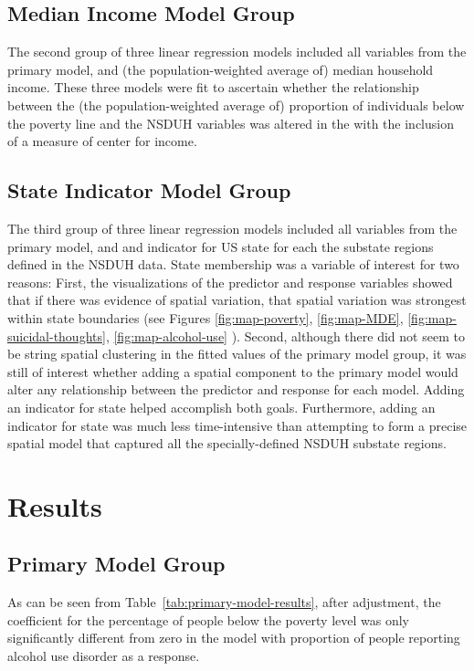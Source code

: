 \documentclass{article}
\begin{document}
\subsection{Median Income Model Group}

The second group of three linear regression models included all variables
from the primary model,
and
(the population-weighted average of)
median household income.
These three models were fit to ascertain whether
the relationship between the
(the population-weighted average of)
proportion of individuals below the poverty line
and the NSDUH variables was altered in the
with the inclusion of a measure of center for income.

\subsection{State Indicator Model Group}

The third group of three linear regression models included all variables
from the primary model,
and and indicator for US state for each the
substate regions defined in the NSDUH data.
State membership was a variable of interest for two
reasons:
First, the visualizations of the predictor and response variables
showed that if there was evidence of spatial variation,
that spatial variation was strongest within state boundaries
(see Figures
\ref{fig:map-poverty},
\ref{fig:map-MDE},
\ref{fig:map-suicidal-thoughts},
\ref{fig:map-alcohol-use}
).
Second, although there did not seem to be string spatial
clustering in the fitted values of the primary model group,
it was still of interest whether adding a spatial component to
the primary model would alter any relationship between
the predictor and response for each model.
Adding an indicator for state helped accomplish both goals.
Furthermore, adding an indicator for state was much less
time-intensive than attempting to form a precise spatial model
that captured all the specially-defined NSDUH substate regions.


\section{Results}

\subsection{Primary Model Group}

As can be seen from Table~\ref{tab:primary-model-results},
after adjustment,
the coefficient for the percentage of people below the poverty level
was only significantly different from zero
in the model with proportion of people reporting
alcohol use disorder as a response.
\end{document}
